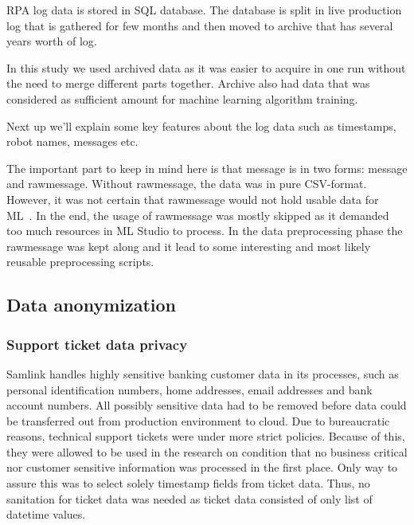 RPA log data is stored in SQL database.
The database is split in live production log
that is gathered for few months
and then moved to archive that has
several years worth of log.

In this study we used archived data
as it was easier to acquire in one run
without the need to merge different parts together.
Archive also had
data that was considered as sufficient amount
for machine learning algorithm training.

\begin{itcomment}
    Next up we'll explain some key features about the log data
    such as timestamps, robot names, messages etc.

    The important part to keep in mind here is that message is in two forms:
    message and rawmessage.
    Without rawmessage, the data was in pure CSV-format.
    However, it was not certain that rawmessage would not hold usable data for ML~.
    In the end, the usage of rawmessage was mostly skipped
    as it demanded too much resources in ML Studio to process.
    In the data preprocessing phase the rawmessage was kept along
    and it lead to some interesting and most likely reusable preprocessing scripts.
\end{itcomment}


\subsection{Data anonymization}\label{subsec:meth-data-anonymization}

\subsubsection*{Support ticket data privacy}
Samlink handles highly sensitive banking customer data in its processes,
such as personal identification numbers, home addresses, email addresses and bank account numbers.
All possibly sensitive data had to be removed
before data could be transferred out from production environment to cloud.
Due to bureaucratic reasons,
technical support tickets were under more strict policies.
Because of this,
they were allowed to be used in the research
on condition that no business critical nor customer sensitive information
was processed in the first place.
Only way to assure this
was to select solely timestamp fields from ticket data.
Thus, no sanitation for ticket data was needed
as ticket data consisted of only list of datetime values.

